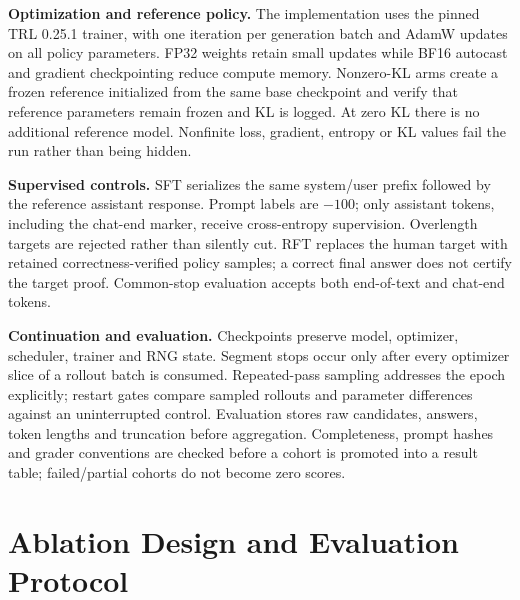\documentclass[10pt,letterpaper]{article}
\begin{document}
\textbf{Optimization and reference policy.} The implementation uses the pinned TRL 0.25.1 trainer, with one iteration per generation batch and AdamW updates on all policy parameters. FP32 weights retain small updates while BF16 autocast and gradient checkpointing reduce compute memory. Nonzero-KL arms create a frozen reference initialized from the same base checkpoint and verify that reference parameters remain frozen and KL is logged. At zero KL there is no additional reference model. Nonfinite loss, gradient, entropy or KL values fail the run rather than being hidden.

\textbf{Supervised controls.} SFT serializes the same system/user prefix followed by the reference assistant response. Prompt labels are $-100$; only assistant tokens, including the chat-end marker, receive cross-entropy supervision. Overlength targets are rejected rather than silently cut. RFT replaces the human target with retained correctness-verified policy samples; a correct final answer does not certify the target proof. Common-stop evaluation accepts both end-of-text and chat-end tokens.

\textbf{Continuation and evaluation.} Checkpoints preserve model, optimizer, scheduler, trainer and RNG state. Segment stops occur only after every optimizer slice of a rollout batch is consumed. Repeated-pass sampling addresses the epoch explicitly; restart gates compare sampled rollouts and parameter differences against an uninterrupted control. Evaluation stores raw candidates, answers, token lengths and truncation before aggregation. Completeness, prompt hashes and grader conventions are checked before a cohort is promoted into a result table; failed/partial cohorts do not become zero scores.

\clearpage

\section{Ablation Design and Evaluation Protocol}
\end{document}
